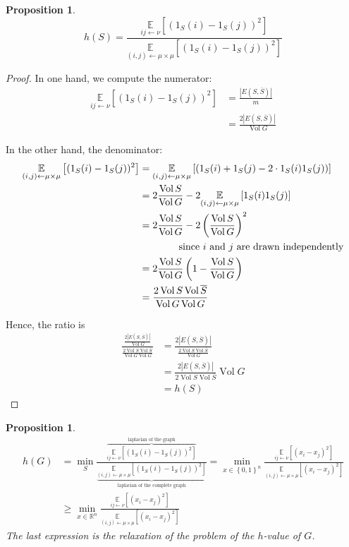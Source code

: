 \documentclass[12pt]{article}
\newtheorem{proposition}[lemma]{Proposition}
\newcommand{\EE}{\mathbb{E}}
\newcommand{\RR}{\mathbb{R}}
\newcommand{\set}[1]{\left\{ #1 \right\}}
\newcommand{\la}{\leftarrow}
\newcommand{\card}[1]{\left\lvert#1\right\rvert}
\newcommand{\esp}[2][]{\underset{#1}{\EE}\left[ #2 \right]}
\DeclareMathOperator{\vol}{Vol}
\begin{document}
\begin{proposition}
    \[
        h(S) = \frac{\esp[ij\la \nu]{(1_S(i)-1_S(j))^2}}{\esp[(i,j)\la\mu\times\mu]{(1_S(i)-1_S(j))^2}}
    \]
\end{proposition}
\begin{proof}
    In one hand, we compute the numerator:
    \[
        \begin{aligned}
            \esp[ij\la\nu]{(1_S(i)-1_S(j))^2} &= \frac{\card{E(S,\overline{S})}}{m}\\
            &= \frac{2\card{E(S,\overline{S})}}{\vol G}
        \end{aligned}
    \]
    
    In the other hand, the denominator:
    \[
        \begin{aligned}
            \esp[(i,j)\la\mu\times\mu]{(1_S(i)-1_S(j))^2} &= \esp[(i,j)\la\mu\times\mu]{(1_S(i)+1_S(j)-2\cdot 1_S(i)1_S(j))}\\
            &= 2 \frac{\vol S}{\vol G} -2\esp[(i,j)\la\mu\times\mu]{1_S(i)1_S(j)}\\
            &=2\frac{\vol S}{\vol G} - 2 \left( \frac{\vol S}{\vol G}\right)^2\\
            &\text{\qquad\qquad since }i\text{ and }j\text{ are drawn independently}\\
            &= 2 \frac{\vol S}{\vol G}\left( 1- \frac{\vol S}{\vol G}\right)\\
            &= \frac{2 \vol S \vol \overline{S}}{\vol G \vol G}
        \end{aligned}
    \]
    
    Hence, the ratio is
    \[
        \begin{aligned}
            \frac{\frac{2\card{E(S,\overline{S})}}{\vol G}}{\frac{2 \vol S \vol \overline{S}}{\vol G \vol G}} &= \frac{2\card{E(S,\overline{S})}}{\frac{2 \vol S \vol \overline{S}}{\vol G}}\\
            &= \frac{2\card{E(S,\overline{S})}}{2 \vol S \vol \overline{S}}\vol G\\
            &= h(S)
        \end{aligned}
    \]
\end{proof}

\begin{proposition}
    \[
        \begin{aligned}
            h(G) &= \min\limits_{S} \frac{\overbrace{\esp[ij\la \nu]{(1_S(i)-1_S(j))^2}}^{\text{laplacian of the graph}}}{\underbrace{\esp[(i,j)\la\mu\times\mu]{(1_S(i)-1_S(j))^2}}_{\text{laplacian of the complete graph}}}=\min\limits_{x\in\set{0,1}^n} \frac{\esp[ij\la\nu]{(x_i-x_j)^2}}{\esp[(i,j)\la\mu\times\mu]{(x_i-x_j)^2}}\\
            &\geqslant \min\limits_{x\in\RR^n} \frac{\esp[ij\la\nu]{(x_i-x_j)^{2}}}{\esp[(i,j)\la\mu\times\mu]{(x_i-x_j)^2}}
        \end{aligned}
    \]
    The last expression is the relaxation of the problem of the $h$-value of $G$.
\end{proposition}
\end{document}
